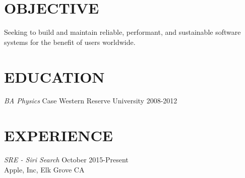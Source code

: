 \documentclass[margin, 10pt]{res} %
\begin{document}
\begin{resume}

 
\section{OBJECTIVE}  

Seeking to build and maintain reliable, performant, and sustainable software systems for the benefit of users worldwide.


\section{EDUCATION}

{\sl BA Physics}  Case Western Reserve University
2008-2012 
 
 
\section{EXPERIENCE}

{\sl SRE - Siri Search} \hfill October 2015-Present \\
Apple, Inc, Elk Grove CA


\end{resume}
\end{document}
